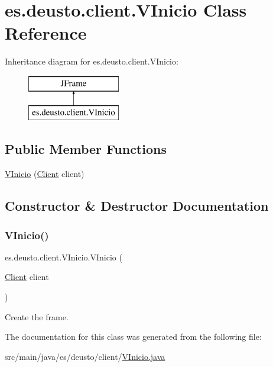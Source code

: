 \hypertarget{classes_1_1deusto_1_1client_1_1_v_inicio}{}\section{es.\+deusto.\+client.\+V\+Inicio Class Reference}
\label{classes_1_1deusto_1_1client_1_1_v_inicio}
Inheritance diagram for es.\+deusto.\+client.\+V\+Inicio\+:\begin{figure}[H]
\begin{center}
\leavevmode
\includegraphics[height=2.000000cm]{classes_1_1deusto_1_1client_1_1_v_inicio}
\end{center}
\end{figure}
\subsection*{Public Member Functions}
\begin{DoxyCompactItemize}
\item 
\mbox{\hyperlink{classes_1_1deusto_1_1client_1_1_v_inicio_afdd2ccc8ad54910cb71c90cd1e546bb7}{V\+Inicio}} (\mbox{\hyperlink{classes_1_1deusto_1_1client_1_1_client}{Client}} client)
\end{DoxyCompactItemize}


\subsection{Constructor \& Destructor Documentation}
\mbox{\label{classes_1_1deusto_1_1client_1_1_v_inicio_afdd2ccc8ad54910cb71c90cd1e546bb7}} 
\subsubsection{\texorpdfstring{VInicio()}{VInicio()}}
{\footnotesize\ttfamily es.\+deusto.\+client.\+V\+Inicio.\+V\+Inicio (\begin{DoxyParamCaption}\item[{\mbox{\hyperlink{classes_1_1deusto_1_1client_1_1_client}{Client}}}]{client }\end{DoxyParamCaption})}

Create the frame. 

The documentation for this class was generated from the following file\+:\begin{DoxyCompactItemize}
\item 
src/main/java/es/deusto/client/\mbox{\hyperlink{_v_inicio_8java}{V\+Inicio.\+java}}\end{DoxyCompactItemize}
